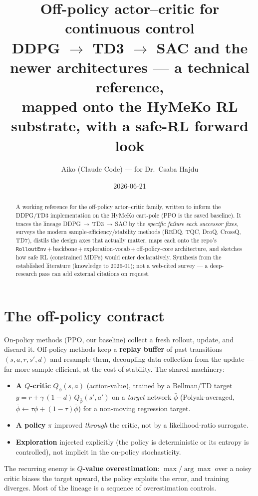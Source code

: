 \documentclass[11pt]{article}
\title{\textbf{Off-policy actor--critic for continuous control}\\[2pt]
\large DDPG $\to$ TD3 $\to$ SAC and the newer architectures --- a technical reference,\\
mapped onto the HyMeKo RL substrate, with a safe-RL forward look}
\author{Aiko (Claude Code) --- for Dr.\ Csaba Hajdu}\date{2026-06-21}
\newcommand{\code}[1]{\texttt{\small #1}}
\begin{document}
\maketitle

\begin{abstract}\noindent
A working reference for the off-policy actor--critic family, written to inform the DDPG/TD3 implementation on
the HyMeKo cart-pole (PPO is the saved baseline). It traces the lineage DDPG\,$\to$\,TD3\,$\to$\,SAC by the
\emph{specific failure each successor fixes}, surveys the modern sample-efficiency/stability methods (REDQ,
TQC, DroQ, CrossQ, TD7), distils the design axes that actually matter, maps each onto the repo's
\code{RolloutEnv}\,+\,backbone\,+\,exploration-vocab\,+\,off-policy-core architecture, and sketches how safe RL
(constrained MDPs) would enter declaratively. Synthesis from the established literature (knowledge to
2026-01); not a web-cited survey --- a deep-research pass can add external citations on request.
\end{abstract}

\section{The off-policy contract}
On-policy methods (PPO, our baseline) collect a fresh rollout, update, and discard it. Off-policy methods keep
a \textbf{replay buffer} of past transitions $(s,a,r,s',d)$ and resample them, decoupling data collection from
the update --- far more sample-efficient, at the cost of stability. The shared machinery:
\begin{itemize}[nosep]
  \item \textbf{A $Q$-critic} $Q_\phi(s,a)$ (action-value), trained by a Bellman/TD target
        $y = r + \gamma\,(1-d)\,Q_{\bar\phi}(s', a')$ on a \emph{target} network $\bar\phi$ (Polyak-averaged,
        $\bar\phi \leftarrow \tau\phi + (1-\tau)\bar\phi$) for a non-moving regression target.
  \item \textbf{A policy} $\pi$ improved \emph{through} the critic, not by a likelihood-ratio surrogate.
  \item \textbf{Exploration} injected explicitly (the policy is deterministic or its entropy is controlled),
        not implicit in the on-policy stochasticity.
\end{itemize}
The recurring enemy is \textbf{$Q$-value overestimation}: $\max/\arg\max$ over a noisy critic biases the
target upward, the policy exploits the error, and training diverges. Most of the lineage is a sequence of
overestimation controls.
\end{document}
